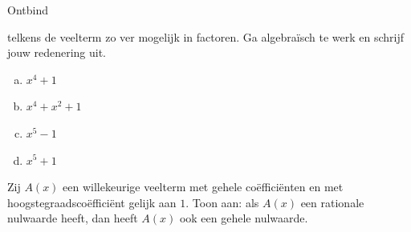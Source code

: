 \documentclass{ximera}
\begin{document}
\clearpage

\begin{Oefening}\setcounter{enumi}{11} 
\hypertarget{oef4.11}{Ontbind} telkens de veelterm zo ver mogelijk in factoren. Ga algebra\"isch te werk en schrijf jouw redenering uit.  
\begin{multicols}{2}
\begin{enumerate}[(a)]
\item
$x^4+1$
\item
$x^4 + x^2 + 1$
\item
$x^5-1$
\item
$x^5+1$
\end{enumerate}
\end{multicols}
\end{Oefening}

\begin{Oefening}
Zij $A(x)$ een willekeurige veelterm met gehele co\"effici\"enten en met hoogstegraadsco\"effici\"ent gelijk aan $1$. Toon aan: als $A(x)$ een rationale nulwaarde heeft, dan heeft $A(x)$ ook een gehele nulwaarde.
\end{Oefening}
\end{document}
